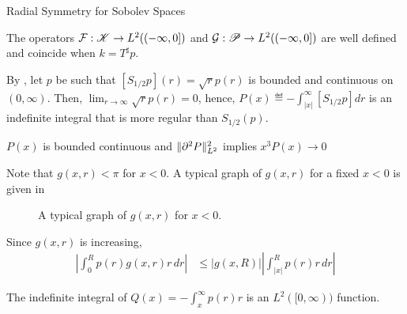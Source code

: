 \begin{chapter}{Radial Symmetry for Sobolev Spaces}
\begin{com}
\begin{prop}
  The operators $\mathcal F:\mathscr K \to L^2((-\infty,0])$ and $\mathcal G:\mathscr P \to L^2((-\infty,0])$ are well defined and coincide when $k = T^\sharp p$.
\end{prop}
By , let $p$ be such that $[S_{1/2}p](r) = \sqrt{r}p(r)$ is bounded and continuous on $(0,\infty)$.
Then, $\lim_{r\to \infty} \sqrt{r}p(r) = 0$, hence, $P(x) \eqdef -\int_{|x|}^\infty [S_{1/2}p] dr$ is an indefinite integral that is more regular than $S_{1/2}(p)$.
\begin{claim}
  $P(x)$ is bounded continuous and $\|\partial^2 P\|_{L^2}^2$ implies $x^3 P(x) \to 0$
\end{claim}
Note that  $g(x,r) < \pi$ for $x < 0$. 
A typical graph of $g(x,r)$ for a fixed $x<0$ is given in  

\begin{figure}[h]
  \caption{A typical graph of $g(x,r)$ for $x<0$.} \label{fig:gfunctionBound}
\end{figure}
Since $g(x,r)$ is increasing,  
\begin{align}
  \left|\int_0^R p(r)g(x,r)r \,dr\right|
    &\le |g(x,R)|\left|\int_{|x|}^R  p(r)r\,dr\right| 
\end{align}
\begin{claim}
  The indefinite integral of $Q(x) = -\int_{x}^\infty p(r) r$ is an $L^2([0,\infty))$ function.
\end{claim}


\end{com}
\end{chapter}
